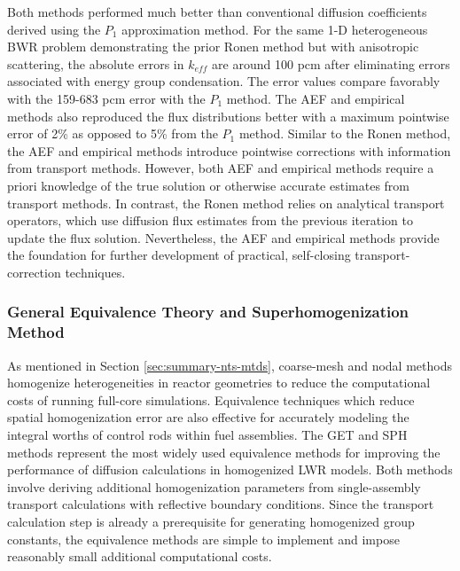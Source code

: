 Both methods performed much better than conventional diffusion coefficients derived using the
$P_1$ approximation method. For the same 1-D heterogeneous \gls{BWR} problem demonstrating the prior
Ronen method \cite{gross_high-accuracy_2020} but with anisotropic scattering, the absolute errors
in $k_{eff}$ are around 100 pcm after eliminating errors associated with energy group
condensation. The error values compare favorably with the 159-683 pcm error with the $P_1$ method.
The \gls{AEF} and empirical methods also reproduced the flux distributions better with a maximum
pointwise error of 2\% as opposed to 5\% from the $P_1$ method. Similar to the Ronen method, the
\gls{AEF} and empirical methods introduce pointwise corrections with information from transport
methods. However, both \gls{AEF} and empirical methods require a priori knowledge of the true
solution or otherwise
accurate estimates from transport methods. In contrast, the Ronen method relies on analytical
transport operators, which use diffusion flux estimates from the previous iteration to update the
flux solution. Nevertheless, the \gls{AEF} and empirical methods provide the foundation for further
development of practical, self-closing transport-correction techniques.

\subsubsection{General Equivalence Theory and Superhomogenization Method}

As mentioned in Section \ref{sec:summary-nts-mtds}, coarse-mesh and nodal methods homogenize
heterogeneities in reactor geometries to reduce the computational costs of running full-core
simulations. Equivalence techniques which reduce spatial homogenization error are also effective
for accurately modeling the integral worths of control rods within fuel assemblies. The \gls{GET}
\cite{koebke_new_1980, smith_nodal_1983} and \gls{SPH} \cite{kavenoky_sph_1978,
hebert_consistent_1991} methods represent the most widely used equivalence methods for improving
the performance of diffusion calculations in homogenized \gls{LWR} models. Both methods involve
deriving additional homogenization parameters from single-assembly transport calculations with
reflective boundary conditions. Since the transport calculation step is already a prerequisite
for generating homogenized group constants, the equivalence methods are simple to implement and
impose reasonably small additional computational costs.

